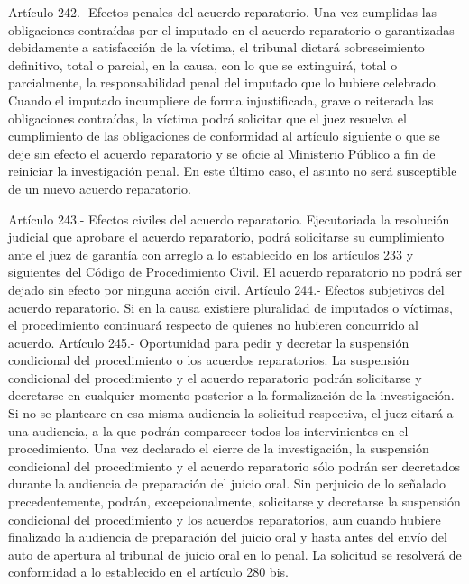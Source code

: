     Artículo 242.- Efectos penales del acuerdo reparatorio. Una vez cumplidas las obligaciones contraídas por el imputado en el acuerdo reparatorio o garantizadas debidamente a satisfacción de la víctima, el tribunal dictará sobreseimiento definitivo, total o parcial, en la causa, con lo que se extinguirá, total o parcialmente, la responsabilidad penal del imputado que lo hubiere celebrado.
    Cuando el imputado incumpliere de forma injustificada, grave o reiterada las obligaciones contraídas, la víctima podrá solicitar que el juez resuelva el cumplimiento de las obligaciones de conformidad al artículo siguiente o que se deje sin efecto el acuerdo reparatorio y se oficie al Ministerio Público a fin de reiniciar la investigación penal. En este último caso, el asunto no será susceptible de un nuevo acuerdo reparatorio.

    Artículo 243.- Efectos civiles del acuerdo reparatorio. Ejecutoriada la resolución judicial que aprobare el acuerdo reparatorio, podrá solicitarse su cumplimiento ante el juez de garantía con arreglo a lo establecido en los artículos 233 y siguientes del Código de Procedimiento Civil.
    El acuerdo reparatorio no podrá ser dejado sin efecto por ninguna acción civil.
    Artículo 244.- Efectos subjetivos del acuerdo reparatorio. Si en la causa existiere pluralidad de imputados o víctimas, el procedimiento continuará respecto de quienes no hubieren concurrido al acuerdo.
    Artículo 245.- Oportunidad para pedir y decretar la suspensión condicional del procedimiento o los acuerdos reparatorios. La suspensión condicional del procedimiento y el acuerdo reparatorio podrán solicitarse y decretarse en cualquier momento posterior a la formalización de la investigación. Si no se planteare en esa misma audiencia la solicitud respectiva, el juez citará a una audiencia, a la que podrán comparecer todos los intervinientes en el procedimiento.
    Una vez declarado el cierre de la investigación, la suspensión condicional del procedimiento y el acuerdo reparatorio sólo podrán ser decretados durante la audiencia de preparación del juicio oral.
    Sin perjuicio de lo señalado precedentemente, podrán, excepcionalmente, solicitarse y decretarse la suspensión condicional del procedimiento y los acuerdos reparatorios, aun cuando hubiere finalizado la audiencia de preparación del juicio oral y hasta antes del envío del auto de apertura al tribunal de juicio oral en lo penal. La solicitud se resolverá de conformidad a lo establecido en el artículo 280 bis.

